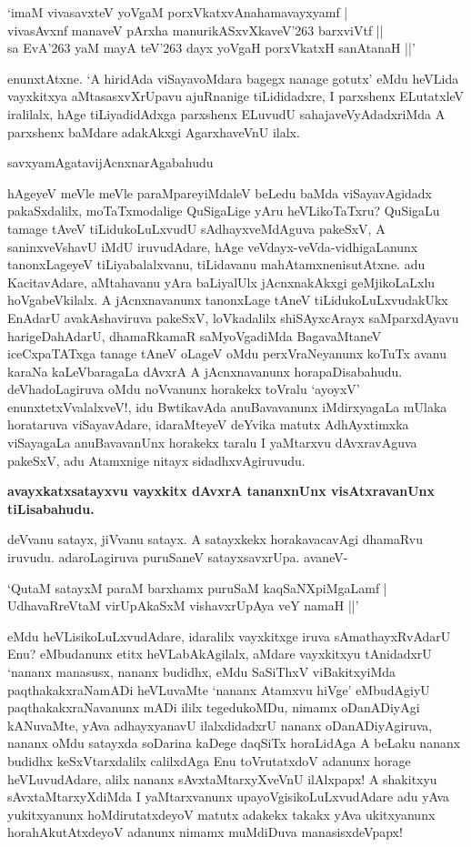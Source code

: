 \begin{shloka}
`imaM vivasavxteV yoVgaM porxVkatxvAnahamavayxyamf |\\
vivasAvxnf manaveV pArxha manurikASxvXkaveV\char'263 barxviVtf ||\\
sa EvA\char'263 yaM mayA teV\char'263 dayx yoVgaH porxVkatxH sanAtanaH ||'
\end{shloka}

enunxtAtxne. `A hiridAda viSayavoMdara bagegx nanage gotutx' eMdu heVLida vayxkitxya aMtasasxvXrUpavu ajuRnanige tiLididadxre, I parxshenx ELutatxleV iralilalx, hAge tiLiyadidAdxga parxshenx ELuvudU sahajaveVyAdadxriMda A parxshenx baMdare adakAkxgi AgarxhaveVnU ilalx.

savxyamAgatavijAcnxnarAgabahudu

hAgeyeV meVle meVle paraMpareyiMdaleV beLedu baMda viSayavAgidadx pakaSxdalilx, moTaTxmodalige QuSigaLige yAru heVLikoTaTxru? QuSigaLu tamage tAveV tiLidukoLuLxvudU sAdhayxveMdAguva pakeSxV, A saninxveVshavU iMdU iruvudAdare, hAge veVdayx-veVda-vidhigaLanunx tanonxLageyeV tiLiyabalalxvanu, tiLidavanu mahAtamxnenisutAtxne. adu KacitavAdare, aMtahavanu yAra baLiyalUlx jAcnxnakAkxgi geMjikoLaLxlu hoVgabeVkilalx. A jAcnxnavanunx tanonxLage tAneV tiLidukoLuLxvudakUkx EnAdarU avakAshaviruva pakeSxV, loVkadalilx shiSAyxcArayx saMparxdAyavu harigeDahAdarU, dhamaRkamaR saMyoVgadiMda BagavaMtaneV iceCxpaTATxga tanage tAneV oLageV oMdu perxVraNeyanunx koTuTx avanu karaNa kaLeVbaragaLa dAvxrA A jAcnxnavanunx horapaDisabahudu. deVhadoLagiruva oMdu noVvanunx horakekx toVralu `ayoyxV' enunxtetxVvalalxveV!, idu BwtikavAda anuBavavanunx iMdirxyagaLa mUlaka horataruva viSayavAdare, idaraMteyeV deYvika matutx AdhAyxtimxka viSayagaLa anuBavavanUnx horakekx taralu I yaMtarxvu dAvxravAguva pakeSxV, adu Atamxnige nitayx sidadhxvAgiruvudu.

\textbf{avayxkatxsatayxvu vayxkitx dAvxrA tananxnUnx visAtxravanUnx tiLisabahudu.}

deVvanu satayx, jiVvanu satayx. A satayxkekx horakavacavAgi dhamaRvu iruvudu. adaroLagiruva puruSaneV satayxsavxrUpa. avaneV-

\begin{shloka}
`QutaM satayxM paraM barxhamx puruSaM kaqSaNXpiMgaLamf |\\
UdhavaRreVtaM virUpAkaSxM vishavxrUpAya veY namaH ||'
\end{shloka}

eMdu heVLisikoLuLxvudAdare, idaralilx vayxkitxge iruva sAmathayxRvAdarU 
Enu? eMbudanunx etitx heVLabAkAgilalx, aMdare vayxkitxyu tAnidadxrU 
`nananx manasusx, nananx budidhx, eMdu SaSiThxV viBakitx\-yiMda 
paqthakakxraNamADi heVLuvaMte `nananx Atamxvu hiVge' eMbudAgiyU 
paqthakakxraNavanunx mADi ililx tegedukoMDu, nimamx oDanADiyAgi 
kANuvaMte, yAva adhayxyanavU ilalxdidadxrU nananx oDanADiyAgiruva, 
nananx oMdu satayxda soDarina kaDege daqSiTx horaLidAga A beLaku nananx budidhx keSxVtarxdalilx calilxdAga Enu toVrutatxdoV adanunx horage heVLuvudAdare, alilx nananx sAvxtaMtarxyXveVnU ilAlxpapx! A \-shakitxyu sAvxtaMtarxyXdiMda I yaMtarxvanunx upayoVgisikoLuLxvudAdare adu yAva yukitxyanunx hoMdirutatxdeyoV matutx adakekx takakx yAva ukitxyanunx horahAkutAtxdeyoV adanunx nimamx muMdiDuva manasisxdeVpapx!

